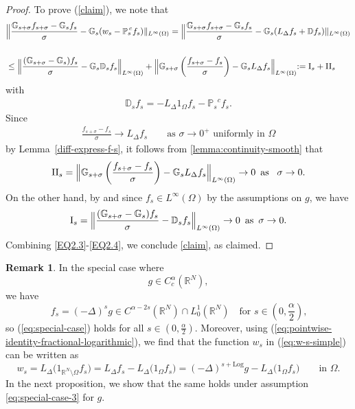 \documentclass[notitlepage,11pt,reqno]{amsart}
\theoremstyle{definition}
\newtheorem{remark}[theorem]{Remark}
\numberwithin{equation}{section}
\newcommand{\cGs}{{\mathbb G}}
\newcommand{\cDs}{{\mathbb D}}
\newcommand{\cPs}{{{\mathbb P}_s}}
\newcommand{\R}{\mathds{R}}
\begin{document}
\begin{proof}
To prove (\ref{claim}), we note that 
\begin{align*}
&\Bigl\| \frac{\cGs_{s+\sigma}f_{s+\sigma}-\cGs_{s}f_s}{\sigma}- \cGs_s (w_s- \cPs^{\! \! c} f_s) \|_{L^\infty(\Omega)}= \Bigl\| \frac{\cGs_{s+\sigma}f_{s+\sigma}-\cGs_{s}f_s}{\sigma}- \cGs_{s} (L_{\Delta} f_s+ \cDs f_s) \|_{L^\infty(\Omega)}\\ \\
&\leq \Bigl\| \frac{(\cGs_{s+\sigma}-\cGs_{s})f_s}{\sigma} - \cGs_{s} \cDs_sf_s\Bigr\|_{L^\infty(\Omega)}+\Bigl\|\cGs_{s+\sigma}\left(\frac{f_{s+ \sigma} -f_s }{\sigma}\right)-\cGs_s L_{\Delta} f_s  \Bigl\|_{L^{\infty}(\Omega)}:=\mathrm I_s +\mathrm {II}_s
    \end{align*}
with 
    \begin{align*}
     \cDs_s f_s = - L_{\Delta} 1_{\Omega}f_s - \cPs^{\! \! c} f_s.    
    \end{align*}
Since 
\begin{align*}
\frac{f_{s+ \sigma} -f_s }{\sigma}  \to L_{\Delta}f_s\qquad \text{as $\sigma \to 0^+$ uniformly in $\Omega$}
\end{align*}
by Lemma~\ref{diff-express-f-s}, it follows from \cref{lemma:continuity-smooth} that 
\begin{align}\label{EQ2.3}
\mathrm{II}_s=\Bigl\|\cGs_{s+\sigma}\left(\frac{f_{s+ \sigma} -f_s }{\sigma}\right)-\cGs_s L_{\Delta}f_s \Bigr\|_{L^{\infty}(\Omega)} \to 0\,\,\, \text{as }\,\,\, \sigma \to 0.
\end{align}
On the other hand, by \cite[Theorem 1.2]{JSW25} and since $f_s\in L^\infty(\Omega)$ by the assumptions on $g$, we have
\begin{align}\label{EQ2.4}
\mathrm{I}_s=\Bigl\|\frac{(\cGs_{s+\sigma}-\cGs_{s})f_s}{\sigma} -\cDs_s f_s\Bigr\|_{L^{\infty}(\Omega)} \to 0 \,\,\, \text{as}\,\,\, \sigma \to 0.    
\end{align}
Combining \eqref{EQ2.3}-\eqref{EQ2.4}, we conclude \eqref{claim}, as claimed.
\end{proof}


\begin{remark}
  \label{rem-special-case-2}
In the special case where   
\begin{equation}
  \label{eq:special-case-2}
g \in C^\alpha_c(\R^N),
\end{equation}
we have
\begin{equation*}
  \label{remainder-C-alpha-minus}
f_s = (-\Delta)^s g \in  C^{\alpha-2s}(\R^N) \cap L^1_0(\R^N)\quad \text{for $s \in (0,\frac{\alpha}{2})$,}  
\end{equation*}
so (\ref{eq:special-case}) holds for all $s \in (0,\frac{\alpha}{2})$. Moreover,  using (\ref{eq:pointwise-identity-fractional-logarithmic}), we find that the function $w_s$ in (\ref{eq:w-s-simple}) can be written as
$$
w_s = L_\Delta \bigl(1_{\R^N \setminus \Omega} f_s \bigr) = L_\Delta f_s -  L_\Delta\bigl(1_{\Omega} f_s \bigr)=(-\Delta)^{s+\mathrm{Log}}g-  L_\Delta\bigl(1_{\Omega} f_s \bigr)\qquad \text{in $\Omega$}.
$$
In the next proposition, we show that the same holds under assumption \eqref{eq:special-case-3} for $g$.
\end{remark}
\end{document}
